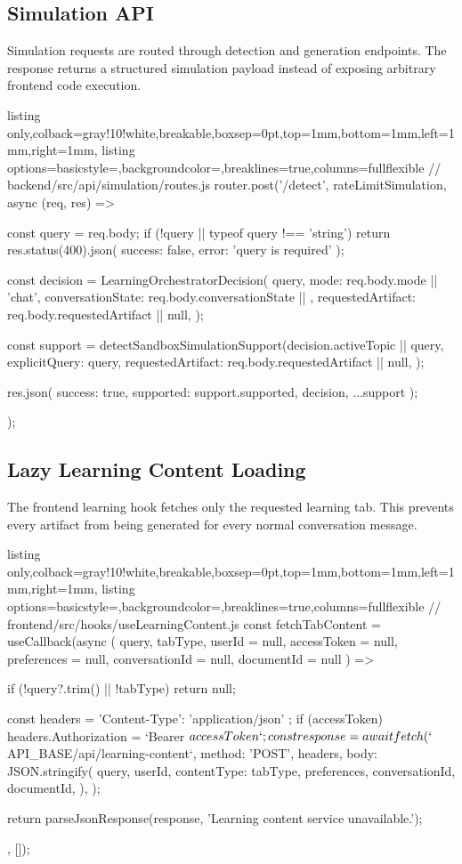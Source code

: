 \subsection{Simulation API}
Simulation requests are routed through detection and generation endpoints. The response returns a structured simulation payload instead of exposing arbitrary frontend code execution.

\begin{tcblisting}{listing only,colback=gray!10!white,breakable,boxsep=0pt,top=1mm,bottom=1mm,left=1mm,right=1mm,
listing options={basicstyle=\footnotesize\ttfamily,backgroundcolor=\color{gray!20},breaklines=true,columns=fullflexible}}
// backend/src/api/simulation/routes.js
router.post('/detect', rateLimitSimulation, async (req, res) => {
  const { query } = req.body;
  if (!query || typeof query !== 'string') {
    return res.status(400).json({ success: false, error: 'query is required' });
  }

  const decision = LearningOrchestratorDecision({
    query,
    mode: req.body.mode || 'chat',
    conversationState: req.body.conversationState || {},
    requestedArtifact: req.body.requestedArtifact || null,
  });

  const support = detectSandboxSimulationSupport(decision.activeTopic || query, {
    explicitQuery: query,
    requestedArtifact: req.body.requestedArtifact || null,
  });

  res.json({ success: true, supported: support.supported, decision, ...support });
});
\end{tcblisting}

\subsection{Lazy Learning Content Loading}
The frontend learning hook fetches only the requested learning tab. This prevents every artifact from being generated for every normal conversation message.

\begin{tcblisting}{listing only,colback=gray!10!white,breakable,boxsep=0pt,top=1mm,bottom=1mm,left=1mm,right=1mm,
listing options={basicstyle=\footnotesize\ttfamily,backgroundcolor=\color{gray!20},breaklines=true,columns=fullflexible}}
// frontend/src/hooks/useLearningContent.js
const fetchTabContent = useCallback(async (
  query,
  tabType,
  userId = null,
  accessToken = null,
  preferences = null,
  conversationId = null,
  documentId = null
) => {
  if (!query?.trim() || !tabType) return null;

  const headers = { 'Content-Type': 'application/json' };
  if (accessToken) headers.Authorization = `Bearer ${accessToken}`;

  const response = await fetch(`${API_BASE}/api/learning-content`, {
    method: 'POST',
    headers,
    body: JSON.stringify({
      query,
      userId,
      contentType: tabType,
      preferences,
      conversationId,
      documentId,
    }),
  });

  return parseJsonResponse(response, 'Learning content service unavailable.');
}, []);
\end{tcblisting}

